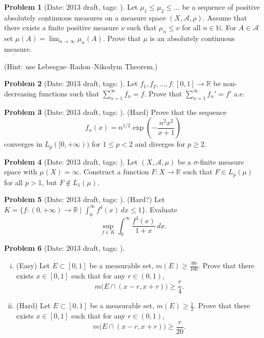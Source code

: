 \documentclass[11pt, notitlepage]{article}
\theoremstyle{definition}
\theoremstyle{definition}
\theoremstyle{definition}
\newtheorem{probstate}{Problem}
\theoremstyle{remark}
\newenvironment{problem}[2]{
    \begin{probstate}[Date: #1, tags: {\color{white} \texttt{#2}}]
}
{
  \end{probstate}
}
\newcommand{\R}{\mathbb{R}}
\newcommand{\N}{\mathbb{N}}
\begin{document}
\begin{problem}{2013 draft}{}
Let $\mu_1 \le \mu_2 \le \ldots$ be a sequence of
    positive absolutely continuous measures on a measure space $(X,
    \mathcal{A},\rho)$. Assume that there exists a finite positive measure
    $\nu$ such that $\mu_n \le \nu$ for all $n\in \N$. For $A \in
    \mathcal{A}$ set $\mu(A) = \lim_{n \to \infty} \mu_n(A)$. Prove
    that $\mu$ is an absolutely continuous measure.

    (Hint: use Lebesgue--Radon--Nikodym Theorem.)
\end{problem}

\begin{problem}{2013 draft}{}
Let $f_1, f_2, \ldots,f: [0,1] \to \R$ be non-decreasing functions such that $\sum_{n=1}^{\infty} f_n =f$. Prove that $\sum_{n=1}^{\infty} f_n' =f'$ a.e.
\end{problem}

\begin{problem}{2013 draft}{}
(Hard) Prove that the sequence
    \[
     f_n(x)= n^{1/2} \exp \left(- \frac{n^2x^2}{x+1} \right)
    \]
    converges in $L_p([0,+\infty))$ for $1 \le p<2$ and diverges for $p \ge 2$.
\end{problem}

\begin{problem}{2013 draft}{}
Let  $(X, \mathcal{A},\mu)$ be a $\sigma$-finite measure space with $\mu(X)=\infty$. Construct a function $F: X \to \R$ such that $F \in L_p(\mu)$ for all $p>1$, but $F \notin L_1(\mu)$.
\end{problem}

\begin{problem}{2013 draft}{}
(Hard?) Let $K=\{f :(0,+\infty) \to \R \mid \int_0^{\infty} f^4(x) \, dx \le 1  \}$. Evaluate
\[
  \sup_{f \in K} \int_0^\infty \frac{f^3(x)}{1+x}  \, dx.
\]
\end{problem}


\begin{problem}{2013 draft}{}
\begin{enumerate}[(i)]
   \item (Easy) Let $E \subset [0,1]$ be a measurable set, $m(E) \ge \frac{99}{100}$. Prove that there exists $x \in [0,1]$ such that for any $r \in (0,1)$,
    \[
      m \big( E \cap (x-r,x+r) \big) \ge \frac{r}{4}.
    \]
    \item (Hard) Let $E \subset [0,1]$ be a measurable set, $m(E) \ge \frac{1}{2}$. Prove that there exists $x \in [0,1]$ such that for any $r \in (0,1)$,
    \[
      m \big(E \cap (x-r,x+r) \big) \ge \frac{r}{20}.
    \]
\end{enumerate}
\end{problem}
\end{document}
